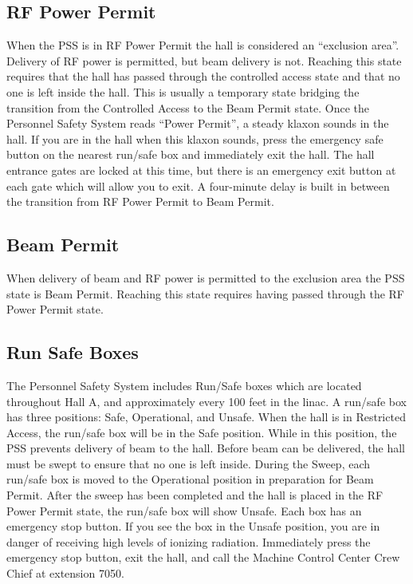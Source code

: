 \begin{safetyen}{10}{10}
\subsection{RF Power Permit} 
\end{safetyen}

When the PSS is in RF Power Permit the hall is considered an
``exclusion area''.  Delivery of RF power is permitted, but beam
delivery is not.  Reaching this state requires that the hall has
passed through the controlled access state and that no one is left
inside the hall. This is usually a temporary state bridging the
transition from the Controlled Access to the Beam Permit state. Once
the Personnel Safety System reads ``Power Permit'', a steady klaxon
sounds in the hall. If you are in the hall when this klaxon sounds,
press the emergency safe button on the nearest run/safe box and
immediately exit the hall. The hall entrance gates are locked at this
time, but there is an emergency exit button at each gate which will
allow you to exit. A four-minute delay is built in between the
transition from RF Power Permit to Beam Permit.
 
\begin{safetyen}{10}{10}
\subsection{Beam Permit}
\end{safetyen}

 When delivery of beam and RF power is permitted to the exclusion area
the PSS state is Beam Permit.  Reaching this state requires having
passed through the RF Power Permit state.

\begin{safetyen}{10}{10}
\subsection{ Run Safe Boxes}
\end{safetyen}

The Personnel Safety System includes Run/Safe boxes which are located
throughout Hall A, and approximately every 100 feet in the linac. A
run/safe box has three positions: Safe, Operational, and Unsafe. When
the hall is in Restricted Access, the run/safe box will be in the Safe
position. While in this position, the PSS prevents delivery of beam to
the hall. Before beam can be delivered, the hall must be swept to
ensure that no one is left inside. During the Sweep, each run/safe box
is moved to the Operational position in preparation for Beam
Permit. After the sweep has been completed and the hall is placed in
the RF Power Permit state, the run/safe box will show Unsafe. Each box
has an emergency stop button. If you see the box in the Unsafe
position, you are in danger of receiving high levels of ionizing
radiation. Immediately press the emergency stop button, exit the hall,
and call the Machine Control Center Crew Chief at extension 7050.

